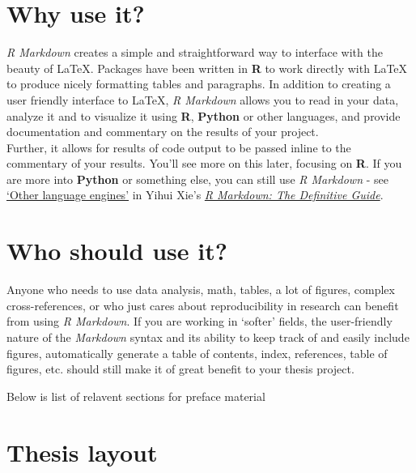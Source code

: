 \documentclass[a4paper, nobind]{templates/ociamthesis}
\begin{document}
\hypertarget{why-use-it}{%
\section*{Why use it?}\label{why-use-it}}

\emph{R Markdown} creates a simple and straightforward way to interface with the beauty of LaTeX.
Packages have been written in \textbf{R} to work directly with LaTeX to produce nicely formatting tables and paragraphs.
In addition to creating a user friendly interface to LaTeX, \emph{R Markdown} allows you to read in your data, analyze it and to visualize it using \textbf{R}, \textbf{Python} or other languages, and provide documentation and commentary on the results of your project.\\
Further, it allows for results of code output to be passed inline to the commentary of your results.
You'll see more on this later, focusing on \textbf{R}. If you are more into \textbf{Python} or something else, you can still use \emph{R Markdown} - see \href{https://bookdown.org/yihui/rmarkdown/language-engines.html}{`Other language engines'} in Yihui Xie's \href{https://bookdown.org/yihui/rmarkdown/language-engines.html}{\emph{R Markdown: The Definitive Guide}}.

\hypertarget{who-should-use-it}{%
\section*{Who should use it?}\label{who-should-use-it}}

Anyone who needs to use data analysis, math, tables, a lot of figures, complex cross-references, or who just cares about reproducibility in research can benefit from using \emph{R Markdown}.
If you are working in `softer' fields, the user-friendly nature of the \emph{Markdown} syntax and its ability to keep track of and easily include figures, automatically generate a table of contents, index, references, table of figures, etc. should still make it of great benefit to your thesis project.

Below is list of relavent sections for preface material

\hypertarget{thesis-layout}{%
\section*{Thesis layout}\label{thesis-layout}}
\end{document}
